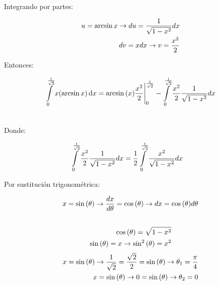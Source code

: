 \documentclass[11pt]{report}
\begin{document}
Integrando por partes:

\begin{equation}
\begin{split}
        u = \arcsin{x} \rightarrow du = \frac{1}{\sqrt{1 - x^2}} dx \\ \notag
        dv = x dx \rightarrow v = \frac{x^2}{2}
\end{split}
\end{equation}

Entonces:

\begin{equation}
\begin{split}
        \int \limits_0^{\frac{1}{\sqrt{2}}} x (\arcsin{x}) \, \text dx
        &= \arcsin{(x)} \frac{x^2}{2} \Bigg|_0^{\frac{1}{\sqrt{2}}}
        - \int \limits_0^{\frac{1}{\sqrt{2}}} \frac{x^2}{2} \frac{1}{\sqrt{1 - x^2}} dx \\ \notag
\end{split}
\end{equation}

Donde:

\begin{equation}
\begin{split}
        \int \limits_0^{\frac{1}{\sqrt{2}}} \frac{x^2}{2} \frac{1}{\sqrt{1 - x^2}} dx
        &= \frac{1}{2} \int \limits_0^{\frac{1}{\sqrt{2}}} \frac{x^2}{\sqrt{1 - x^2}} dx \notag
\end{split}
\end{equation}

Por sustitución trigonométrica:

\begin{equation}
\begin{split}
        x = \sin{(\theta)} \rightarrow \frac{dx}{d\theta} = \cos{(\theta)}
        \rightarrow dx = \cos{(\theta)} d\theta \\ \notag
\end{split}
\end{equation}
\begin{equation}
\begin{split}
        \cos{(\theta)} = \sqrt{1 - x^2} \\ \notag
        \sin{(\theta)} = x \rightarrow \sin^2{(\theta)} = x^2
\end{split}
\end{equation}
\begin{equation}
\begin{split}
        x = \sin{(\theta)} \rightarrow \frac{1}{\sqrt{2}} = \frac{\sqrt{2}}{2} = \sin{(\theta)}
        \rightarrow \theta_1 = \frac{\pi}{4} \\ \notag
        x = \sin{(\theta)} \rightarrow 0 = \sin{(\theta)}
        \rightarrow \theta_2 = 0 \notag
\end{split}
\end{equation}
\end{document}
